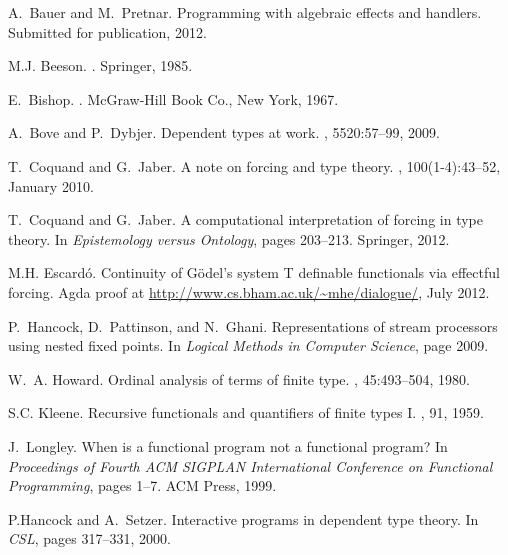 \documentclass{entcs} \usepackage{prentcsmacro}
\begin{document}
\begin{thebibliography}{10}

A.~Bauer and M.~Pretnar.
\newblock Programming with algebraic effects and handlers.
\newblock Submitted for publication, 2012.

M.J. Beeson.
.
\newblock Springer, 1985.

E.~Bishop.
.
\newblock McGraw-Hill Book Co., New York, 1967.

A.~Bove and P.~Dybjer.
\newblock Dependent types at work.
, 5520:57--99, 2009.

T.~Coquand and G.~Jaber.
\newblock A note on forcing and type theory.
, 100(1-4):43--52, January 2010.

T.~Coquand and G.~Jaber.
\newblock A computational interpretation of forcing in type theory.
\newblock In {\em Epistemology versus Ontology}, pages 203--213. Springer,
  2012.

M.H. Escard\'o.
\newblock Continuity of {G}\"odel's system {T} definable functionals via
  effectful forcing.
\newblock Agda proof at \url{http://www.cs.bham.ac.uk/~mhe/dialogue/}, July
  2012.

P.~Hancock, D.~Pattinson, and N.~Ghani.
\newblock Representations of stream processors using nested fixed points.
\newblock In {\em Logical Methods in Computer Science}, page 2009.

W.~A. Howard.
\newblock Ordinal analysis of terms of finite type.
, 45:493--504, 1980.

S.C. Kleene.
\newblock Recursive functionals and quantifiers of finite types {I}.
, 91, 1959.

J.~Longley.
\newblock When is a functional program not a functional program?
\newblock In {\em Proceedings of Fourth ACM SIGPLAN International Conference on
  Functional Programming}, pages 1--7. ACM Press, 1999.

P.Hancock and A.~Setzer.
\newblock Interactive programs in dependent type theory.
\newblock In {\em CSL}, pages 317--331, 2000.


\end{thebibliography}
\end{document}
